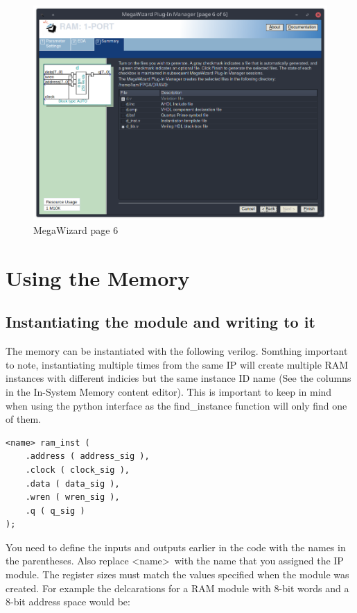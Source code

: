 \documentclass[letter,12pt]{article}
\begin{document}
\begin{figure}[H]
  \centering
  \includegraphics[width=.83\linewidth]{pics/Mega6.png}
  \caption{MegaWizard page 6}
\end{figure}


\section{Using the Memory}
\subsection{Instantiating the module and writing to it}

The memory can be instantiated with the following verilog. Somthing important to note, instantiating multiple times from the same IP will create multiple RAM instances with different indicies but the same instance ID name (See the columns in the In-System Memory content editor). This is important to keep in mind when using the python interface as the find\_instance function will only find one of them.

\begin{verbatim}
<name> ram_inst (
    .address ( address_sig ),
    .clock ( clock_sig ),
    .data ( data_sig ),
    .wren ( wren_sig ),
    .q ( q_sig )
);
\end{verbatim}

You need to define the inputs and outputs earlier in the code with the names in the parentheses. Also replace \textless name\textgreater\ with the name that you assigned the IP module. The register sizes must match the values specified when the module was created. For example the delcarations for a RAM module with 8-bit words and a 8-bit address space would be:
\end{document}
